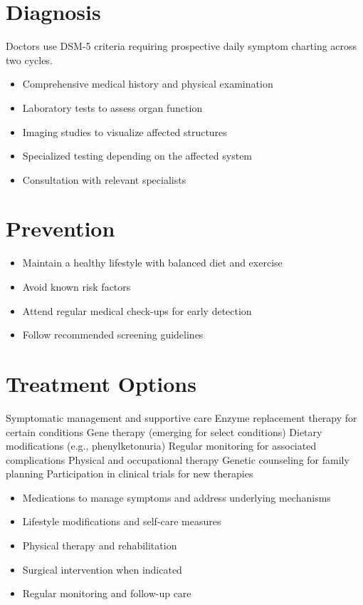 \section{Diagnosis}
Doctors use DSM-5 criteria requiring prospective daily symptom charting across two cycles.

\begin{itemize}[noitemsep]
  \item Comprehensive medical history and physical examination
  \item Laboratory tests to assess organ function
  \item Imaging studies to visualize affected structures
  \item Specialized testing depending on the affected system
  \item Consultation with relevant specialists
\end{itemize}
\section{Prevention}
\begin{itemize}[noitemsep]
  \item Maintain a healthy lifestyle with balanced diet and exercise
  \item Avoid known risk factors
  \item Attend regular medical check-ups for early detection
  \item Follow recommended screening guidelines
\end{itemize}
\section{Treatment Options}
Symptomatic management and supportive care Enzyme replacement therapy for certain conditions Gene therapy (emerging for select conditions) Dietary modifications (e.g., phenylketonuria) Regular monitoring for associated complications Physical and occupational therapy Genetic counseling for family planning Participation in clinical trials for new therapies

\begin{itemize}[noitemsep]
  \item Medications to manage symptoms and address underlying mechanisms
  \item Lifestyle modifications and self-care measures
  \item Physical therapy and rehabilitation
  \item Surgical intervention when indicated
  \item Regular monitoring and follow-up care
\end{itemize}
